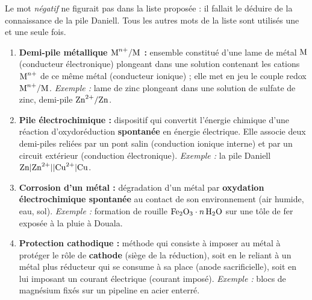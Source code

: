 \documentclass[11pt]{article}
\newcounter{popsec}
\newcounter{popsub}
\newcommand{\courssub}[1]{%
  \stepcounter{popsub}%
  \par\vspace{9pt}\noindent{\popxbold\fontsize{11.5}{13}\selectfont\color{popink}{\color{poporange}\thepopsec.\thepopsub}\hspace{6pt}#1}\par\nopagebreak\vspace{4pt}
}
\begin{document}
\begin{attention}
Le mot \emph{négatif} ne figurait pas dans la liste proposée : il fallait le déduire de la connaissance de la pile Daniell. Tous les autres mots de la liste sont utilisés une et une seule fois.
\end{attention}

\begin{corrige}
\begin{enumerate}
\item \textbf{Demi-pile métallique $\ce{M^{n+}}/\ce{M}$ :} ensemble constitué d'une lame de métal $\ce{M}$ (conducteur électronique) plongeant dans une solution contenant les cations $\ce{M^{n+}}$ de ce même métal (conducteur ionique) ; elle met en jeu le couple redox $\ce{M^{n+}}/\ce{M}$. \emph{Exemple :} lame de zinc plongeant dans une solution de sulfate de zinc, demi-pile $\ce{Zn^2+}/\ce{Zn}$.
\item \textbf{Pile électrochimique :} dispositif qui convertit l'énergie chimique d'une réaction d'oxydoréduction \textbf{spontanée} en énergie électrique. Elle associe deux demi-piles reliées par un pont salin (conduction ionique interne) et par un circuit extérieur (conduction électronique). \emph{Exemple :} la pile Daniell $\ce{Zn}|\ce{Zn^2+}||\ce{Cu^2+}|\ce{Cu}$.
\item \textbf{Corrosion d'un métal :} dégradation d'un métal par \textbf{oxydation électrochimique spontanée} au contact de son environnement (air humide, eau, sol). \emph{Exemple :} formation de rouille $\ce{Fe2O3}\cdot n\,\ce{H2O}$ sur une tôle de fer exposée à la pluie à Douala.
\item \textbf{Protection cathodique :} méthode qui consiste à imposer au métal à protéger le rôle de \textbf{cathode} (siège de la réduction), soit en le reliant à un métal plus réducteur qui se consume à sa place (anode sacrificielle), soit en lui imposant un courant électrique (courant imposé). \emph{Exemple :} blocs de magnésium fixés sur un pipeline en acier enterré.
\end{enumerate}
\end{corrige}

\courssub{Je m'entraîne}
\end{document}
